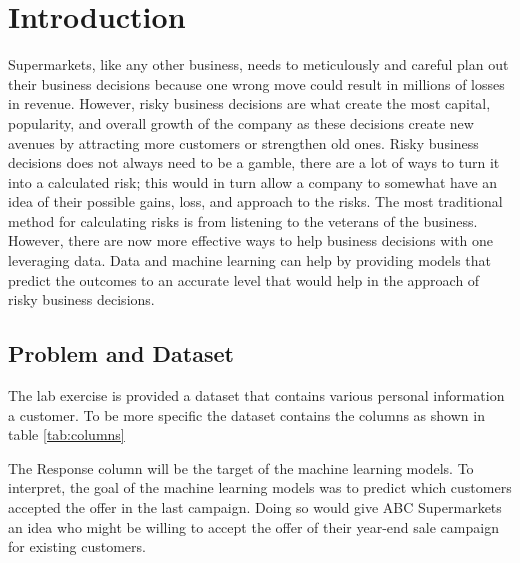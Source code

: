 \section{Introduction}


Supermarkets, like any other business, needs to meticulously and careful plan out their business decisions because one wrong move could result in millions of losses in revenue. However, risky business decisions are what create the most capital, popularity, and overall growth of the company as these decisions create new avenues by attracting more customers or strengthen old ones. Risky business decisions does not always need to be a gamble, there are a lot of ways to turn it into a calculated risk; this would in turn allow a company to somewhat have an idea of their possible gains, loss, and approach to the risks. The most traditional method for calculating risks is from listening to the veterans of the business. However, there are now more effective ways to help business decisions with one leveraging data. Data and machine learning can help by providing models that predict the outcomes to an accurate level that would help in the approach of risky business decisions. 

\subsection{Problem and Dataset}

The lab exercise is provided a dataset that contains various personal information a customer. To be more specific the dataset contains the columns as shown in table \ref{tab:columns}

The Response column will be the target of the machine learning models. To interpret, the goal of the machine learning models was to predict which customers accepted the offer in the last campaign. Doing so would give ABC Supermarkets an idea who might be willing to accept the offer of their year-end sale campaign for existing customers. 

